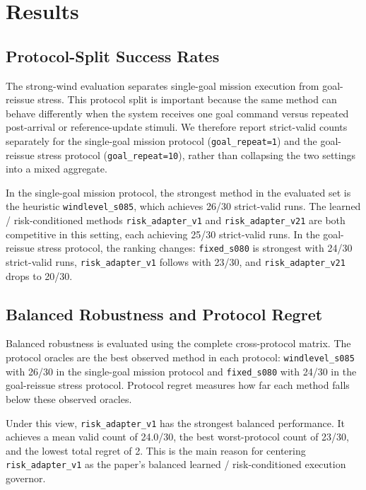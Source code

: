 \section{Results}

\subsection{Protocol-Split Success Rates}

The strong-wind evaluation separates single-goal mission execution from
goal-reissue stress. This protocol split is important because the same method
can behave differently when the system receives one goal command versus
repeated post-arrival or reference-update stimuli. We therefore report
strict-valid counts separately for the single-goal mission protocol
(\texttt{goal\_repeat=1}) and the goal-reissue stress protocol
(\texttt{goal\_repeat=10}), rather than collapsing the two settings into a
mixed aggregate.

In the single-goal mission protocol, the strongest method in the evaluated set
is the heuristic \texttt{windlevel\_s085}, which achieves 26/30 strict-valid
runs. The learned / risk-conditioned methods \texttt{risk\_adapter\_v1} and
\texttt{risk\_adapter\_v21} are both competitive in this setting, each
achieving 25/30 strict-valid runs. In the goal-reissue stress protocol, the
ranking changes: \texttt{fixed\_s080} is strongest with 24/30 strict-valid
runs, \texttt{risk\_adapter\_v1} follows with 23/30, and
\texttt{risk\_adapter\_v21} drops to 20/30.



\subsection{Balanced Robustness and Protocol Regret}

Balanced robustness is evaluated using the complete cross-protocol matrix. The
protocol oracles are the best observed method in each protocol:
\texttt{windlevel\_s085} with 26/30 in the single-goal mission protocol and
\texttt{fixed\_s080} with 24/30 in the goal-reissue stress protocol. Protocol
regret measures how far each method falls below these observed oracles.

Under this view, \texttt{risk\_adapter\_v1} has the strongest balanced
performance. It achieves a mean valid count of 24.0/30, the best
worst-protocol count of 23/30, and the lowest total regret of 2. This is the
main reason for centering \texttt{risk\_adapter\_v1} as the paper's balanced
learned / risk-conditioned execution governor.

